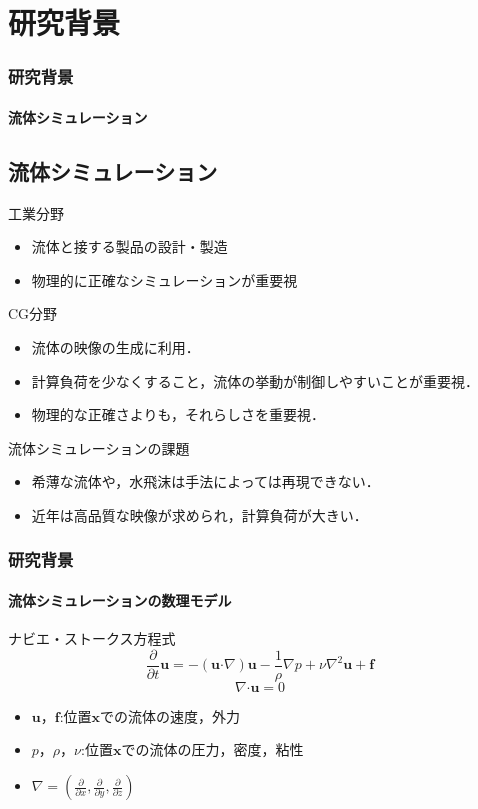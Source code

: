 \documentclass[aspectratio=169,dvipdfmx,hyperref={bookmarks=true}]{beamer}
\begin{document}
   \section{研究背景}
 \begin{frame}
 \frametitle{研究背景}
   \framesubtitle{流体シミュレーション}
 \subsection{流体シミュレーション}
  \begin{block}{工業分野}
  \begin{itemize}
	\item 流体と接する製品の設計・製造
	\item 物理的に正確なシミュレーションが重要視
\end{itemize}
\end{block}
\begin{block}{CG分野}
\begin{itemize}
	\item 流体の映像の生成に利用．
	\item 計算負荷を少なくすること，流体の挙動が制御しやすいことが重要視．
	\item 物理的な正確さよりも，それらしさを重要視．
\end{itemize}
\end{block}

 \begin{block}{流体シミュレーションの課題}
  \begin{itemize}
\item 希薄な流体や，水飛沫は手法によっては再現できない．
\item 近年は高品質な映像が求められ，計算負荷が大きい．
\end{itemize}
\end{block}
 \end{frame}
  \begin{frame}
  \frametitle{研究背景}
  \framesubtitle{流体シミュレーションの数理モデル}
    \begin{block}{ナビエ・ストークス方程式}
\[
\frac{\partial}{\partial t}\bm{u} = - (\bm{u} \boldsymbol{\cdot}\nabla) \bm{u} - \frac{1}{\rho}\nabla p + \nu\nabla^2\bm{u} + \bm{f}
\]
\[
\nabla\boldsymbol{\cdot}\bm{u} = 0
\]
\begin{itemize}
	\item $\bm{u}$，$\bm{f}$:位置$\bm{x}$での流体の速度，外力
	\item $p$，$\rho$，$\nu$:位置$\bm{x}$での流体の圧力，密度，粘性
	\item $\nabla = ( \frac{\partial}{\partial x}, \frac{\partial}{\partial y}, \frac{\partial}{\partial z})$
\end{itemize}
\end{block}
\end{frame}
\end{document}
